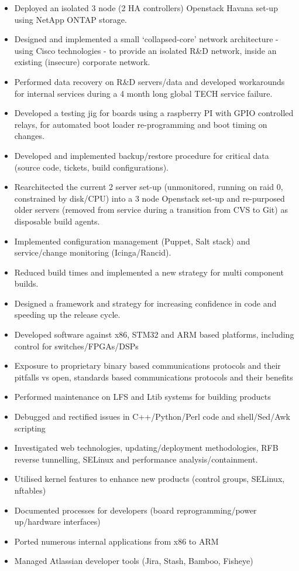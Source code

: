 \begin{itemize}
\itemsep1pt\parskip0pt
\item
  Deployed an isolated 3 node (2 HA controllers) Openstack Havana set-up
  using NetApp ONTAP storage.
\item
  Designed and implemented a small `collapsed-core' network architecture
  - using Cisco technologies - to provide an isolated R\&D network,
  inside an existing (insecure) corporate network.
\item
  Performed data recovery on R\&D servers/data and developed workarounds
  for internal services during a 4 month long global TECH service
  failure.
\item
  Developed a testing jig for boards using a raspberry PI with GPIO
  controlled relays, for automated boot loader re-programming and boot
  timing on changes.
\item
  Developed and implemented backup/restore procedure for critical data
  (source code, tickets, build configurations).
\item
  Rearchitected the current 2 server set-up (unmonitored, running on
  raid 0, constrained by disk/CPU) into a 3 node Openstack set-up and
  re-purposed older servers (removed from service during a transition
  from CVS to Git) as disposable build agents.
\item
  Implemented configuration management (Puppet, Salt stack) and
  service/change monitoring (Icinga/Rancid).
\item
  Reduced build times and implemented a new strategy for multi component
  builds.
\item
  Designed a framework and strategy for increasing confidence in code
  and speeding up the release cycle.
\item
  Developed software against x86, STM32 and ARM based platforms,
  including control for switches/FPGAs/DSPs
\item
  Exposure to proprietary binary based communications protocols and
  their pitfalls vs open, standards based communications protocols and
  their benefits
\item
  Performed maintenance on LFS and Ltib systems for building products
\item
  Debugged and rectified issues in C++/Python/Perl code and
  shell/Sed/Awk scripting
\item
  Investigated web technologies, updating/deployment methodologies, RFB
  reverse tunnelling, SELinux and performance analysis/containment.
\item
  Utilised kernel features to enhance new products (control groups,
  SELinux, nftables)
\item
  Documented processes for developers (board reprogramming/power
  up/hardware interfaces)
\item
  Ported numerous internal applications from x86 to ARM
\item
  Managed Atlassian developer tools (Jira, Stash, Bamboo, Fisheye)
\end{itemize}

